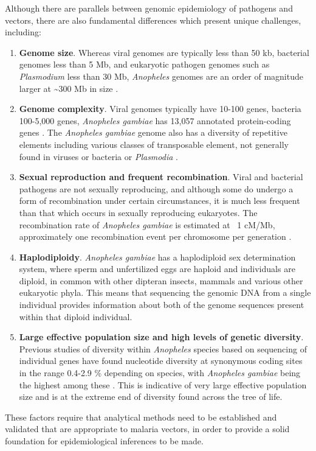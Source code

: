 \documentclass[a4paper,11pt,abstracton,hidelinks]{scrartcl}
\begin{document}
Although there are parallels between genomic epidemiology of pathogens and vectors, there are also fundamental differences which present unique challenges, including:
%
\begin{enumerate}
%
\item \textbf{Genome size}.
%
Whereas viral genomes are typically less than 50 kb, bacterial genomes less than 5 Mb, and eukaryotic pathogen genomes such as \textit{Plasmodium} less than 30 Mb, \textit{Anopheles} genomes are an order of magnitude larger at \textasciitilde 300 Mb in size \citep{Neafsey2015}.
%
\item \textbf{Genome complexity}.
%
Viral genomes typically have 10-100 genes, bacteria 100-5,000 genes, \textit{Anopheles gambiae} has 13,057 annotated protein-coding genes \citep{AgamP4.12,GiraldoCalderon2015}.
%
The \textit{Anopheles gambiae} genome also has a diversity of repetitive elements including various classes of transposable element, not generally found in viruses or bacteria or \textit{Plasmodia} \citep{Tu2004,FernandezMedina2011}.
%
\item \textbf{Sexual reproduction and frequent recombination}.
%
Viral and bacterial pathogens are not sexually reproducing, and although some do undergo a form of recombination under certain circumstances, it is much less frequent than that which occurs in sexually reproducing eukaryotes. The recombination rate of \textit{Anopheles gambiae} is estimated at ~1 cM/Mb, approximately one recombination event per chromosome per generation \citep{Pombi2006}.
%
\item \textbf{Haplodiploidy}. 
%
\textit{Anopheles gambiae} has a haplodiploid sex determination system, where sperm and unfertilized eggs are haploid and individuals are diploid, in common with other dipteran insects, mammals and various other eukaryotic phyla.
%
This means that sequencing the genomic DNA from a single individual provides information about both of the genome sequences present within that diploid individual.
%
\item \textbf{Large effective population size and high levels of genetic diversity}.
%
Previous studies of diversity within \textit{Anopheles} species based on sequencing of individual genes have found nucleotide diversity at synonymous coding sites in the range 0.4-2.9 \% depending on species, with \textit{Anopheles gambiae} being the highest among these \citep{Leffler2012}.
%
This is indicative of very large effective population size and is at the extreme end of diversity found across the tree of life.
%
\end{enumerate}
%
These factors require that analytical methods need to be established and validated that are appropriate to malaria vectors, in order to provide a solid foundation for epidemiological inferences to be made.
\end{document}
